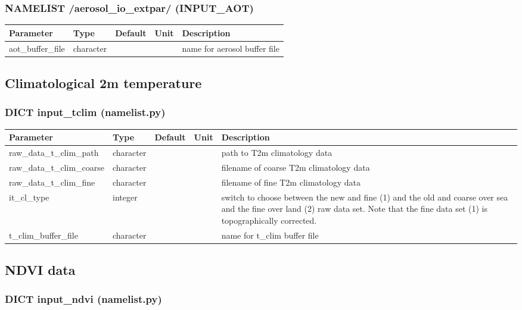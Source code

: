 \documentclass[a4paper,10pt,DIV14,BCOR1cm,titlepage,twoside]{scrartcl}
\providecommand{\tabularnewline}{\\}
\begin{document}
\subsubsection*{NAMELIST /aerosol\_io\_extpar/ (INPUT\_AOT)}
\begin{longtable}{|p{4cm}|p{1.5cm}|p{1.5cm}|p{1cm}|p{6cm}|}
\hline 
\textbf{Parameter}& \textbf{Type}& \textbf{Default}& \textbf{Unit}& \textbf{Descriptio}n
\tabularnewline
\hline
\endhead
\hline
aot\_buffer\_file & character & &  & name for aerosol buffer file
\tabularnewline
\hline
\bottomrule
\end{longtable}

\subsection{Climatological 2m temperature}\label{namelist_input_for_extpar_cru}

\subsubsection*{DICT input\_tclim (namelist.py)}

\begin{longtable}{|p{4cm}|p{1.5cm}|p{1.5cm}|p{1cm}|p{6cm}|}
\hline 
\textbf{Parameter}& \textbf{Type}& \textbf{Default}& \textbf{Unit}& \textbf{Description}
\tabularnewline
\hline
\endhead
\hline 
raw\_data\_t\_clim\_path & character & &  & path to T2m climatology data \tabularnewline
\hline 
raw\_data\_t\_clim\_coarse & character & &  & filename of coarse T2m climatology  data \tabularnewline
\hline
raw\_data\_t\_clim\_fine & character & &  & filename of fine T2m climatology  data \tabularnewline
\hline
it\_cl\_type & integer & & & switch to choose between the new and fine (1) and the old and coarse over sea and the fine over land (2) raw data set. 
Note that the fine data set (1) is topographically corrected.\tabularnewline
\hline
t\_clim\_buffer\_file & character & &  & name for t\_clim buffer file
\tabularnewline
\hline

\bottomrule
\end{longtable}

\subsection{NDVI data}\label{namelist_input_for_extpar_ndvi}

\subsubsection*{DICT input\_ndvi (namelist.py)}
\end{document}
